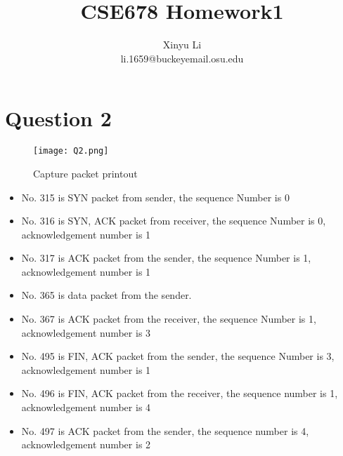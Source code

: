 \documentclass[a4paper,12pt]{article}
\begin{document}
\title{CSE678 Homework1}
\author{Xinyu Li\\li.1659@buckeyemail.osu.edu}
\maketitle
\section*{Question 2}
\begin{figure}[!htbp]
\texttt{[image: Q2.png]}
\caption{Capture packet printout}
\end{figure} 
\begin{itemize}
\item No. 315 is SYN packet from sender, the sequence Number is 0
\item No. 316 is SYN, ACK packet from receiver, the sequence Number is 0, acknowledgement number is 1
\item No. 317 is ACK packet from the sender, the sequence Number is 1, acknowledgement number is 1
\item No. 365 is data packet from the sender.
\item No. 367 is ACK packet from the receiver, the sequence Number is 1, acknowledgement number is 3
\item No. 495 is FIN, ACK packet from the sender, the sequence Number is 3, acknowledgement number is 1
\item No. 496 is FIN, ACK packet from the receiver, the sequence number is 1, acknowledgement number is 4
\item No. 497 is ACK packet from the sender, the sequence number is 4, acknowledgement number is 2
\end{itemize}
\end{document}
